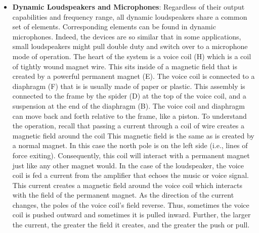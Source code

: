 \documentclass{report}
\begin{document}
\begin{itemize}
            \begin{quote}
                "\textit{A transducer is a device that transforms energy from one type to another.}" 
            \end{quote}
            An electric motor transforms electrical energy into mechanical energy and a generator does the precise opposite, transforming mechanical energy into electrical energy. More commonly, the word transducer is associated with devices such as loudspeakers and microphones. A loudspeaker transforms its electrical input into an acoustic pressure wave (sound) whereas the microphone performs the complementary function of transforming an acoustic pressure wave into an electrical signal. While there are different ways of constructing these devices, the most common designs are the dynamic loudspeaker and dynamic microphone, both of which rely on the principle of electromagnetic induction.
        \item \textbf{Dynamic Loudspeakers and Microphones}: Regardless of their output capabilities and frequency range, all dynamic loudspeakers share a common set of elements. Corresponding elements can be found in dynamic microphones. Indeed, the devices are so similar that in some applications, small loudspeakers might pull double duty and switch over to a microphone mode of operation.
            \bigbreak \noindent 
            \bigbreak \noindent 
            The heart of the system is a voice coil (H) which is a coil of tightly wound magnet wire. This sits inside of a magnetic field that is created by a powerful permanent magnet (E). The voice coil is connected to a diaphragm (F) that is is usually made of paper or plastic. This assembly is connected to the frame by the spider (D) at the top of the voice coil, and a suspension at the end of the diaphragm (B). The voice coil and diaphragm can move back and forth relative to the frame, like a piston.
            \bigbreak \noindent 
            To understand the operation, recall that passing a current through a coil of wire creates a magnetic field around the coil
            \bigbreak \noindent 
            This magnetic field is the same as is created by a normal magnet. In this case the north pole is on the left side (i.e., lines of force exiting). Consequently, this coil will interact with a permanent magnet just like any other magnet would. In the case of the loudspeaker, the voice coil is fed a current from the amplifier that echoes the music or voice signal. This current creates a magnetic field around the voice coil which interacts with the field of the permanent magnet. As the direction of the current changes, the poles of the voice coil's field reverse. Thus, sometimes the voice coil is pushed outward and sometimes it is pulled inward. Further, the larger the current, the greater the field it creates, and the greater the push or pull.

\end{itemize}
\end{document}
